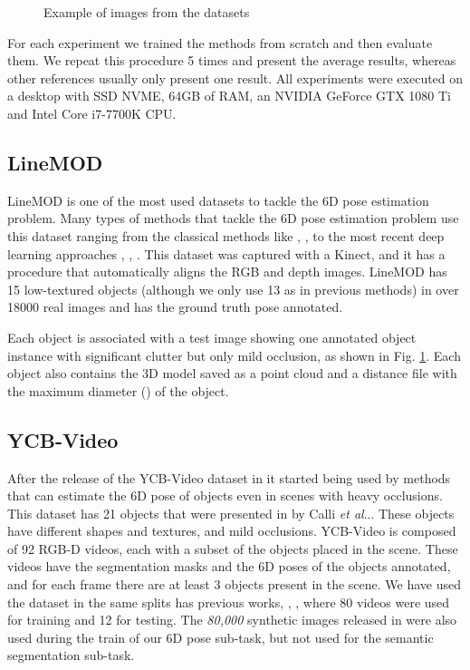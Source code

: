 \documentclass[runningheads]{llncs}
\makeatletter
\DeclareRobustCommand\onedot{\futurelet\@let@token\@onedot}
\def\@onedot{\ifx\@let@token.\else.\null\fi\xspace}
\def\etal{\emph{et al}\onedot}
\makeatother
\begin{document}
\begin{figure}[thpb]
\vspace{-2em}
    \centering
    \qquad
    \caption{Example of images from the datasets}
    \label{fig:linemod}\vspace{-2em}
\end{figure}
For each experiment we trained the methods from scratch and then evaluate them.
We repeat this procedure 5 times and present the average results, whereas other references usually only present one result.
All experiments were executed on a desktop with SSD NVME, 64GB of RAM, an NVIDIA GeForce GTX 1080 Ti and Intel Core i7-7700K CPU.

\subsection{LineMOD}
LineMOD \cite{linemod} is one of the most used datasets to tackle the 6D pose estimation problem.
Many types of methods that tackle the 6D pose estimation problem use this dataset ranging from the classical methods like \cite{lineex1}, \cite{lineex2}, \cite{lineex3} to the most recent deep learning approaches \cite{lineex4}, \cite{densefusion}, \cite{posecnn}.
This dataset was captured with a Kinect, and it has a procedure that automatically aligns the RGB and depth images.
LineMOD has 15 low-textured objects (although we only use 13 as in previous methods) in over 18000 real images and has the ground truth pose annotated.

Each object is associated with a test image showing one annotated object instance with significant clutter but only mild occlusion, as shown in Fig. \ref{fig:linemod}.
Each object also contains the 3D model saved as a point cloud and a distance file with the maximum diameter () of the object.


\subsection{YCB-Video}
After the release of the YCB-Video dataset in \cite{posecnn} it started being used by methods that can estimate the 6D pose of objects even in scenes with heavy occlusions.
This dataset has 21 objects that were presented in \cite{originalycb} by Calli \etal. 
These objects have different shapes and textures, and mild occlusions.
YCB-Video is composed of 92 RGB-D videos, each with a subset of the objects placed in the scene.
These videos have the segmentation masks and the 6D poses of the objects annotated, and for each frame there are at least 3 objects present in the scene.
We have used the dataset in the same splits has previous works, \cite{posecnn}, \cite{densefusion}, where 80 videos were used for training and 12 for testing.
The \textit{80,000} synthetic images released in \cite{posecnn} were also used during the train of our 6D pose sub-task, but not used for the semantic segmentation sub-task.
\end{document}
